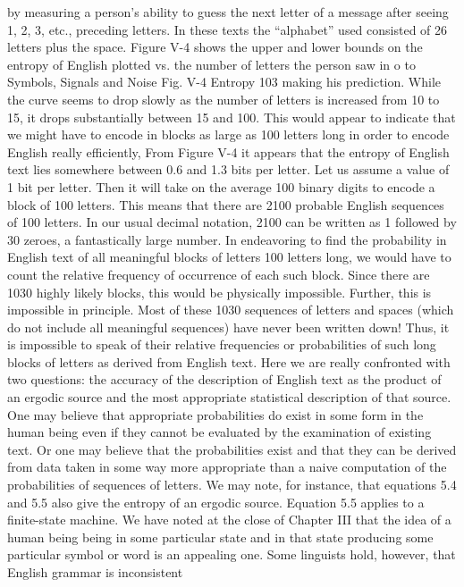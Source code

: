{{{by measuring a person’s ability to guess the next letter of a message
after seeing 1, 2, 3, etc., preceding letters. In these texts the
“alphabet” used consisted of 26 letters plus the space.
Figure V-4 shows the upper and lower bounds on the entropy
of English plotted vs. the number of letters the person saw in
o to
Symbols, Signals and Noise
Fig. V-4
Entropy 103
making his prediction. While the curve seems to drop slowly as
the number of letters is increased from 10 to 15, it drops substantially
between 15 and 100. This would appear to indicate that we
might have to encode in blocks as large as 100 letters long in order
to encode English really efficiently,
From Figure V-4 it appears that the entropy of English text lies
somewhere between 0.6 and 1.3 bits per letter. Let us assume a
value of 1 bit per letter. Then it will take on the average 100 binary
digits to encode a block of 100 letters. This means that there are
2100 probable English sequences of 100 letters. In our usual decimal
notation, 2100 can be written as 1 followed by 30 zeroes, a fantastically
large number.
In endeavoring to find the probability in English text of all
meaningful blocks of letters 100 letters long, we would have to
count the relative frequency of occurrence of each such block.
Since there are 1030 highly likely blocks, this would be physically
impossible.
Further, this is impossible in principle. Most of these 1030
sequences of letters and spaces (which do not include all meaningful
sequences) have never been written down! Thus, it is impossible
to speak of their relative frequencies or probabilities of such long
blocks of letters as derived from English text.
Here we are really confronted with two questions: the accuracy
of the description of English text as the product of an ergodic
source and the most appropriate statistical description of that
source. One may believe that appropriate probabilities do exist in
some form in the human being even if they cannot be evaluated
by the examination of existing text. Or one may believe that the
probabilities exist and that they can be derived from data taken
in some way more appropriate than a naive computation of the
probabilities of sequences of letters. We may note, for instance,
that equations 5.4 and 5.5 also give the entropy of an ergodic
source. Equation 5.5 applies to a finite-state machine. We have
noted at the close of Chapter III that the idea of a human being
being in some particular state and in that state producing some
particular symbol or word is an appealing one.
Some linguists hold, however, that English grammar is inconsistent
}}}
